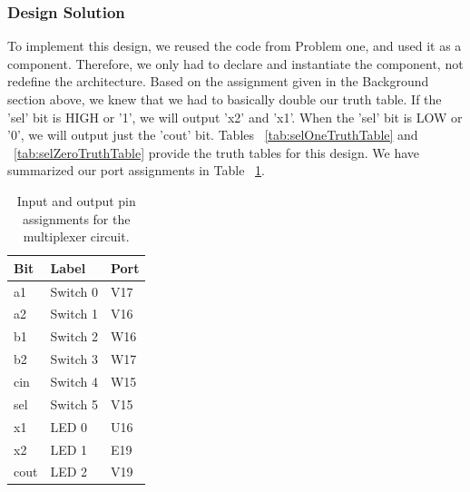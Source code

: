 \documentclass[11pt]{article}
\begin{document}
\subsubsection{Design Solution}
To implement this design, we reused the code from Problem one, and used it as a component. Therefore, we only had to declare and instantiate the component, not redefine the architecture. Based on the assignment given in the Background section above, we knew that we had to basically double our truth table. If the 'sel' bit is HIGH or '1', we will output 'x2' and 'x1'. When the 'sel' bit is LOW or '0', we will output just the 'cout' bit. Tables ~\ref{tab:selOneTruthTable} and ~\ref{tab:selZeroTruthTable} provide the truth tables for this design. We have summarized our port assignments in Table ~\ref{tab:ledMuxPorts}.

\begin{table}[H]
\begin{center}
	\begin{tabular}{| l | l | l |}
		\hline
		Bit & Label & Port \\ \hline
		a1 & Switch 0 & V17 \\ \hline
		a2 & Switch 1 & V16 \\ \hline
		b1 & Switch 2 & W16 \\ \hline
		b2 & Switch 3 & W17 \\ \hline
		cin & Switch 4 & W15 \\ \hline
		sel & Switch 5 & V15 \\ \hline
		x1 & LED 0 & U16 \\ \hline
		x2 & LED 1 & E19 \\ \hline
		cout & LED 2 & V19 \\ \hline
	\end{tabular}
	\caption{\label{tab:ledMuxPorts}Input and output pin assignments for the multiplexer circuit.}
\end{center}	
\end{table}
\end{document}
